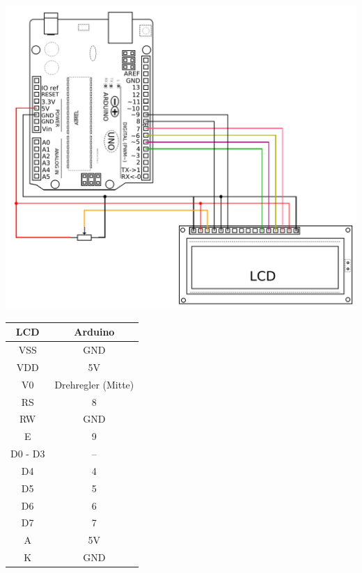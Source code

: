 \bigskip
\begin{minipage}{0.64\textwidth}
	\centering
	\includegraphics[width=\textwidth]{./Zeichnungen/Schaltplan-Arduino-LCD.png}
\end{minipage}
\hfill
\begin{minipage}{0.34\textwidth}
	\small
	\centering
	\begin{tabular}{c|c}
		\textbf{LCD} & \textbf{Arduino} \\ \hline
		VSS & GND \\ \hline
		VDD & 5V \\ \hline
		V0 & Drehregler (Mitte)\\ \hline
		RS & 8\\ \hline
		RW & GND\\ \hline
		E & 9\\ \hline
		D0 - D3 & -- \\ \hline
		D4 & 4\\ \hline
		D5 & 5\\ \hline
		D6 & 6\\ \hline
		D7 & 7\\ \hline
		A & 5V\\ \hline
		K & GND\\ \hline
	\end{tabular}
\end{minipage}

